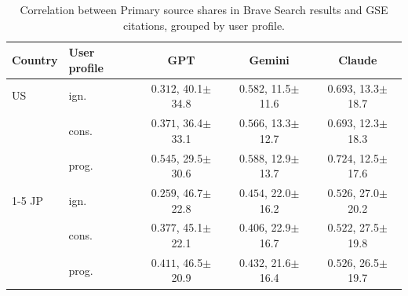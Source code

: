 \begin{table}[t]
\centering
\footnotesize
\setlength{\tabcolsep}{1.8pt}
\caption{Correlation between Primary source shares in Brave Search results and GSE citations, grouped by user profile.}
\label{tab:brave-gse-primary-share-correlation-user-profile}
\begin{tabular}{llccc}
\toprule
\textbf{Country} & \textbf{User profile} & \textbf{GPT} & \textbf{Gemini} & \textbf{Claude} \\
\midrule
US & ign. & \textcolor{red!50!black}{$0.312$}, 40.1$\pm$34.8 & \textcolor{red!70!black}{$0.582$}, 11.5$\pm$11.6 & \textcolor{red!70!black}{$0.693$}, 13.3$\pm$18.7 \\
 & cons. & \textcolor{red!50!black}{$0.371$}, 36.4$\pm$33.1 & \textcolor{red!70!black}{$0.566$}, 13.3$\pm$12.7 & \textcolor{red!70!black}{$0.693$}, 12.3$\pm$18.3 \\
 & prog. & \textcolor{red!70!black}{$0.545$}, 29.5$\pm$30.6 & \textcolor{red!70!black}{$0.588$}, 12.9$\pm$13.7 & \textcolor{red!90!black}{$0.724$}, 12.5$\pm$17.6 \\
\cmidrule(lr){1-5}
JP & ign. & \textcolor{red!30!black}{$0.259$}, 46.7$\pm$22.8 & \textcolor{red!50!black}{$0.454$}, 22.0$\pm$16.2 & \textcolor{red!70!black}{$0.526$}, 27.0$\pm$20.2 \\
 & cons. & \textcolor{red!50!black}{$0.377$}, 45.1$\pm$22.1 & \textcolor{red!50!black}{$0.406$}, 22.9$\pm$16.7 & \textcolor{red!70!black}{$0.522$}, 27.5$\pm$19.8 \\
 & prog. & \textcolor{red!50!black}{$0.411$}, 46.5$\pm$20.9 & \textcolor{red!50!black}{$0.432$}, 21.6$\pm$16.4 & \textcolor{red!70!black}{$0.526$}, 26.5$\pm$19.7 \\
\bottomrule
\end{tabular}
\end{table}
